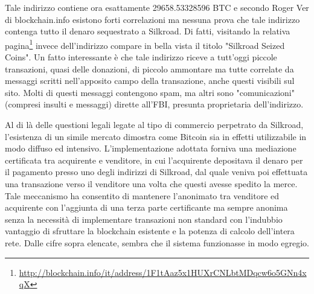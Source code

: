 Tale indirizzo contiene ora esattamente 29658.53328596 BTC e secondo Roger Ver di blockchain.info esistono forti correlazioni ma nessuna prova che tale indirizzo contenga tutto il denaro sequestrato a Silkroad. Di fatti, visitando la relativa pagina\footnote{\url{http://blockchain.info/it/address/1F1tAaz5x1HUXrCNLbtMDqcw6o5GNn4xqX}} invece dell'indirizzo compare in bella vista il titolo "Silkroad Seized Coins".
Un fatto interessante è che tale indirizzo riceve a tutt'oggi piccole transazioni, quasi delle donazioni, di piccolo ammontare ma tutte correlate da messaggi scritti nell'apposito campo della transazione, anche questi visibili sul sito. Molti di questi messaggi contengono spam, ma altri sono "comunicazioni" (compresi insulti e messaggi) dirette all'FBI, presunta proprietaria dell'indirizzo.

Al di là delle questioni legali legate al tipo di commercio perpetrato da Silkroad, l'esistenza di un simile mercato dimostra come Bitcoin sia in effetti utilizzabile in modo diffuso ed intensivo. L'implementazione adottata forniva una mediazione certificata tra acquirente e venditore, in cui l'acquirente depositava il denaro per il pagamento presso uno degli indirizzi di Silkroad, dal quale veniva poi effettuata una transazione verso il venditore una volta che questi avesse spedito la merce. Tale meccanismo ha consentito di mantenere l'anonimato tra venditore ed acquirente con l'aggiunta di una terza parte certificante ma sempre anonima senza la necessità di implementare transazioni non standard con l'indubbio vantaggio di sfruttare la blockchain esistente e la potenza di calcolo dell'intera rete. Dalle cifre sopra elencate, sembra che il sistema funzionasse in modo egregio.
